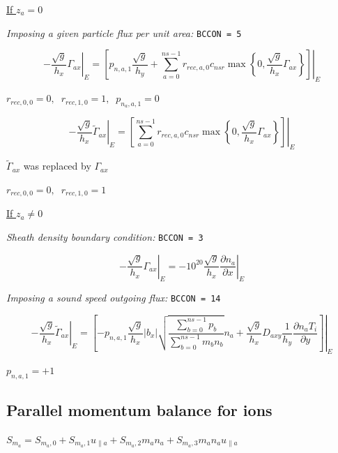 \documentclass[a4paper,10pt]{report}
\begin{document}
\underline{If $z_a = 0$}

{\em Imposing a given particle flux per unit area:} {\tt BCCON = 5}

\begin{equation}
\left. - \frac{\sqrt g}{h_x} \Gamma_{ax} \right|_E
=
\left. \left[
p_{n,a,1} \frac{\sqrt g}{h_y}
+
\sum \limits_{a=0}^{ns-1} r_{rec,a,0} c_{nsr}
\max \left\{0, \frac{\sqrt g}{h_x} \Gamma_{ax} \right\}
\right] \right|_E
\end{equation}

$r_{rec,0,0} = 0,\;\; r_{rec,1,0} = 1,\;\; p_{n_a,a,1} = 0 $



\begin{equation}
\left. - \frac{\sqrt g}{h_x} \widetilde{\Gamma}_{ax} \right|_E
=
\left. \left[
\sum \limits_{a=0}^{ns-1} r_{rec,a,0} c_{nsr}
\max \left\{0, \frac{\sqrt g}{h_x} \Gamma_{ax} \right\}
\right] \right|_E
\end{equation}

$\widetilde{\Gamma}_{ax}$ was replaced by $\Gamma_{ax}$

$r_{rec,0,0} = 0,\;\; r_{rec,1,0} = 1$

\underline{If $z_a \neq 0$}

{\em Sheath density boundary condition:} {\tt BCCON = 3}

\begin{equation*}
\left. - \frac{\sqrt g}{h_x} \Gamma_{ax} \right|_E =
- 10^{20} \left. \frac{\sqrt{g}}{h_x} \frac{\partial n_a}{\partial x}
\right|_E
\end{equation*}

{\em Imposing a sound speed outgoing flux:} {\tt BCCON = 14}

\begin{equation*}
\left. - \frac{\sqrt g}{h_x} \widetilde{\Gamma}_{ax} \right|_E
=
\left. \left[
- p_{n,a,1} \frac{\sqrt g}{h_x} |b_x|
\sqrt{\frac{\sum \limits_{b=0}^{ns-1} p_b}{\sum \limits_{b=0}^{ns-1} m_b n_b}} n_a
+
\frac{\sqrt g}{h_x} D_{axy} \frac 1{h_y} \frac{\partial n_a T_i}{\partial y}
\right]
\right|_E
\end{equation*}

$p_{n,a,1} = +1 $

\subsection{Parallel momentum balance for ions}

$S_{m_a} = S_{m_a,0} + S_{m_a,1} u_{\parallel a} + S_{m_a,2} m_a n_a + S_{m_a,3} m_a n_a u_{\parallel a}$
\end{document}
